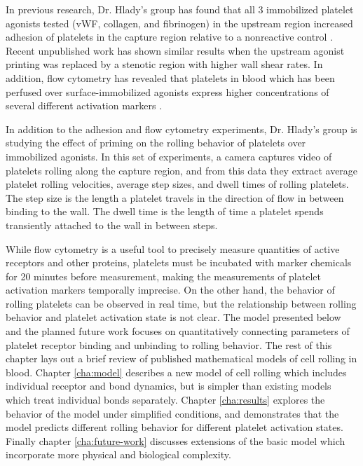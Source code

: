 In previous research, Dr. Hlady's group has found that all 3
immobilized platelet agonists tested (vWF, collagen, and fibrinogen)
in the upstream region increased adhesion of platelets in the capture
region relative to a nonreactive control
\cite{Corum2012,Eichinger2016}. Recent unpublished work has shown
similar results when the upstream agonist printing was replaced by a
stenotic region with higher wall shear rates. In addition, flow
cytometry has revealed that platelets in blood which has been perfused
over surface-immobilized agonists express higher concentrations of
several different activation markers \cite{Corum2012,Eichinger2016}.

In addition to the adhesion and flow cytometry experiments,
Dr. Hlady's group is studying the effect of priming on the
rolling behavior of platelets over immobilized agonists. In this set
of experiments, a camera captures video of platelets rolling along the
capture region, and from this data they extract average platelet
rolling velocities, average step sizes, and dwell times of rolling
platelets. The step size is the length a platelet travels in the
direction of flow in between binding to the wall. The dwell time is
the length of time a platelet spends transiently attached to the wall
in between steps.

While flow cytometry is a useful tool to precisely measure quantities
of active receptors and other proteins, platelets must be incubated
with marker chemicals for 20 minutes before measurement, making the
measurements of platelet activation markers temporally imprecise. On
the other hand, the behavior of rolling platelets can be observed in
real time, but the relationship between rolling behavior and platelet
activation state is not clear. The model presented below and the
planned future work focuses on quantitatively connecting parameters of
platelet receptor binding and unbinding to rolling behavior. The rest
of this chapter lays out a brief review of published mathematical
models of cell rolling in blood. Chapter \ref{cha:model} describes a
new model of cell rolling which includes individual receptor and bond
dynamics, but is simpler than existing models which treat individual
bonds separately. Chapter \ref{cha:results} explores the behavior of
the model under simplified conditions, and demonstrates that the model
predicts different rolling behavior for different platelet activation
states. Finally chapter \ref{cha:future-work} discusses extensions of the
basic model which incorporate more physical and biological complexity.

